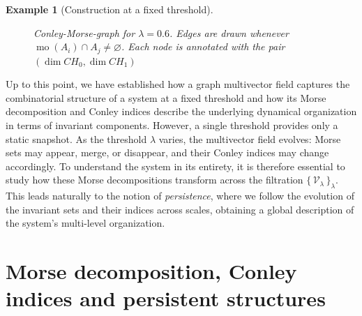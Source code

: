 \documentclass{article}
\theoremstyle{definition}
\theoremstyle{plain}
\newtheorem{example}{Example}
\theoremstyle{remark}
\newcommand{\1}{\mathbbm{1}}  %
\begin{document}
\begin{example}[Construction at a fixed threshold]
\begin{figure}[ht]
\centering
{}
\caption{Conley-Morse-graph for $\lambda=0.6$.
Edges are drawn whenever $\operatorname{mo}(A_i)\cap A_j\neq\varnothing$.
Each node is annotated with the pair
$(\dim CH_0,\dim CH_1)$}
\label{fig:Mgraph-example}
\end{figure}

\end{example}
 
Up to this point, we have established how a graph multivector field
captures the combinatorial structure of a system at a fixed threshold
and how its Morse decomposition and Conley indices describe the
underlying dynamical organization in terms of invariant components.
However, a single threshold provides only a static snapshot.
As the threshold $\lambda$ varies, the multivector field evolves:
Morse sets may appear, merge, or disappear, and their Conley indices
may change accordingly.
To understand the system in its entirety, it is therefore essential
to study how these Morse decompositions transform across the filtration
$\{\,\mathcal{V}_\lambda\,\}_\lambda$.
This leads naturally to the notion of \emph{persistence}, where we follow
the evolution of the invariant sets and their indices across scales,
obtaining a global description of the system’s multi-level organization.

 









 
 
  


 

\section{Morse decomposition, Conley indices and persistent structures}
\label{sec:morse-persistence}
\end{document}
